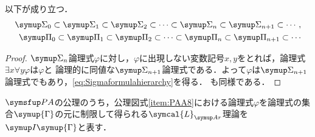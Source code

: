 
\begin{Lemma} \label{Lemma:formulahierarchy}
	以下が成り立つ．
	\begin{align}
		\SigmaFormula_0 \subset \SigmaFormula_1 \subset \SigmaFormula_2 \subset \dotsb \subset \SigmaFormula_n \subset \SigmaFormula_{n + 1} \subset \dotsb,
		\label{eq:Sigmaformulahierarchy} \\
		\PiFormula_0 \subset \PiFormula_1 \subset \PiFormula_2 \subset \dotsb \subset \PiFormula_n \subset \PiFormula_{n+1} \subset \dotsb
		\label{eq:Piformulahierarchy}
	\end{align}
\end{Lemma}

\begin{proof}
	\(\SigmaFormula_n\)論理式\(\varphi\)に対し，\(\varphi\)に出現しない変数記号\(x, y\)をとれば，論理式\(\exists x \forall y \varphi\)は\(\varphi\)と
	論理的に同値な\(\SigmaFormula_{n + 1}\)論理式である．よって\(\varphi\)は\(\SigmaFormula_{n + 1}\)論理式でもあり，\cref{eq:Sigmaformulahierarchy}を得る．
	も同様である．
\end{proof}


\begin{Def} \label{Def:paa8restriction}
	\(\PA\)の公理のうち，公理図式\cref{item:PAA8}における論理式\(\varphi\)を論理式の集合\(\symup{\Gamma}\)の元に制限して得られる\(\symcal{L}_{\Ar}\)理論を
	\(\InductionLimitedTheory{\symup{\Gamma}}\)と表す．
\end{Def}

